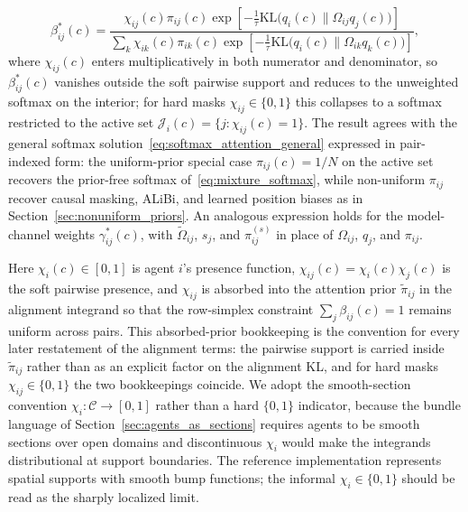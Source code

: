 \documentclass[11pt]{article}
\begin{document}
\begin{equation}
\beta_{ij}^*(c) =
\frac{
  \chi_{ij}(c)\pi_{ij}(c)\exp\left[
    -\tfrac{1}{\tau}\mathrm{KL}\big(q_i(c) \big\| \Omega_{ij}q_j(c)\big)
  \right]
}{
  \displaystyle\sum_{k}
  \chi_{ik}(c)\pi_{ik}(c)\exp\left[
    -\tfrac{1}{\tau}\mathrm{KL}\big(q_i(c) \big\| \Omega_{ik}q_k(c)\big)
  \right]
},
\label{eq:beta_optimal}
\end{equation}
where $\chi_{ij}(c)$ enters multiplicatively in both numerator and denominator, so $\beta^*_{ij}(c)$ vanishes outside the soft pairwise support and reduces to the unweighted softmax on the interior; for hard masks $\chi_{ij} \in \{0, 1\}$ this collapses to a softmax restricted to the active set $\mathcal{J}_i(c) = \{j : \chi_{ij}(c) = 1\}$. The result agrees with the general softmax solution~\eqref{eq:softmax_attention_general} expressed in pair-indexed form: the uniform-prior special case $\pi_{ij}(c) = 1/N$ on the active set recovers the prior-free softmax of~\eqref{eq:mixture_softmax}, while non-uniform $\pi_{ij}$ recover causal masking, ALiBi, and learned position biases as in Section~\ref{sec:nonuniform_priors}. An analogous expression holds for the model-channel weights $\gamma_{ij}^*(c)$, with $\tilde{\Omega}_{ij}$, $s_j$, and $\pi^{(s)}_{ij}$ in place of $\Omega_{ij}$, $q_j$, and $\pi_{ij}$.

Here $\chi_i(c) \in [0, 1]$ is agent $i$'s presence function, $\chi_{ij}(c) = \chi_i(c) \chi_j(c)$ is the soft pairwise presence, and $\chi_{ij}$ is absorbed into the attention prior $\tilde{\pi}_{ij}$ in the alignment integrand so that the row-simplex constraint $\sum_j \beta_{ij}(c) = 1$ remains uniform across pairs. This absorbed-prior bookkeeping is the convention for every later restatement of the alignment terms: the pairwise support is carried inside $\tilde{\pi}_{ij}$ rather than as an explicit factor on the alignment KL, and for hard masks $\chi_{ij} \in \{0,1\}$ the two bookkeepings coincide. We adopt the smooth-section convention $\chi_i: \mathcal{C} \to [0, 1]$ rather than a hard $\{0, 1\}$ indicator, because the bundle language of Section~\ref{sec:agents_as_sections} requires agents to be smooth sections over open domains and discontinuous $\chi_i$ would make the integrands distributional at support boundaries. The reference implementation represents spatial supports with smooth bump functions; the informal $\chi_i \in \{0, 1\}$ should be read as the sharply localized limit.
\end{document}

